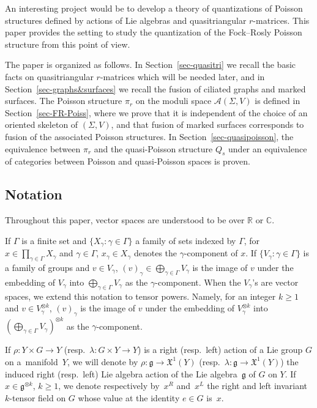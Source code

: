 \documentclass[pdftex]{sigma}
\numberwithin{equation}{section}
\newcommand{\IC}{\mathbb{C}}
\newcommand{\IR}{\mathbb{R}}
\newcommand{\XX}{\mathfrak{X}}
\def \g {\mathfrak{a}}
\def \g {\mathfrak{g}}
\def \A {{\mathcal{A}}}
\begin{document}
An interesting project would be to develop a theory of quantizations of Poisson structures def\/ined by actions of Lie algebras and quasitriangular $r$-matrices. This paper provides the setting to study the quantization of the Fock--Rosly Poisson structure from this point of view.

The paper is organized as follows. In Section~\ref{sec-quasitri} we recall the basic facts on quasitriangular $r$-matrices which will be needed later, and in Section~\ref{sec-graphs&surfaces} we recall the fusion of ciliated graphs and marked surfaces. The Poisson structure $\pi_r$ on the moduli space $\A(\Sigma, V)$ is def\/ined in Section~\ref{sec-FR-Poiss}, where we prove that it is independent of the choice of an oriented skeleton of $(\Sigma, V)$, and that fusion of marked surfaces corresponds to fusion of the associated Poisson structures. In Section~\ref{sec-quasipoisson}, the equivalence between $\pi_r$ and the quasi-Poisson structure $Q_s$ under an equivalence of categories between Poisson and quasi-Poisson spaces is proven.

\subsection{Notation} \label{nota}

Throughout this paper, vector spaces are understood to be over $\IR$ or $\IC$.

If $\Gamma$ is a f\/inite set and $\{X_\gamma \colon \gamma \in \Gamma\}$ a family of sets indexed by $\Gamma$, for $x \in \prod_{\gamma \in \Gamma} X_\gamma$ and $\gamma \in \Gamma$, $x_\gamma \in X_\gamma$ denotes the $\gamma$-component of $x$. If $\{V_\gamma\colon \gamma \in \Gamma\}$ is a family of groups and $v \in V_\gamma$, $(v)_\gamma \in \bigoplus_{\gamma \in \Gamma}V_\gamma$ is the image of $v$ under the embedding of $V_\gamma$ into $\bigoplus_{\gamma \in \Gamma}V_\gamma$ as the $\gamma$-component. When the $V_\gamma$'s are vector spaces, we extend this notation to tensor powers. Namely, for an integer $k \geq 1$ and $v \in V_\gamma^{\otimes k}$, $(v)_\gamma$ is the image of $v$ under the embedding of $V_\gamma^{\otimes k}$ into $(\bigoplus_{\gamma \in \Gamma}V_\gamma)^{\otimes k}$ as the $\gamma$-component.

If $\rho\colon Y \times G \to Y$ (resp.\ $\lambda\colon G \times Y \to Y$) is a right (resp.\ left) action of a Lie group $G$ on a~mani\-fold~$Y$, we will denote by $\rho\colon \g \to \XX^1(Y)$ (resp.\ $\lambda\colon \g \to \XX^1(Y)$) the induced right (resp.\ left) Lie algebra action of the Lie algebra~$\g$ of $G$ on $Y$. If $x \in \g^{\otimes k}$, $k \geq 1$, we denote respectively by~$x^R$ and~$x^L$ the right and left invariant $k$-tensor f\/ield on $G$ whose value at the identity $e \in G$ is~$x$.
\end{document}
